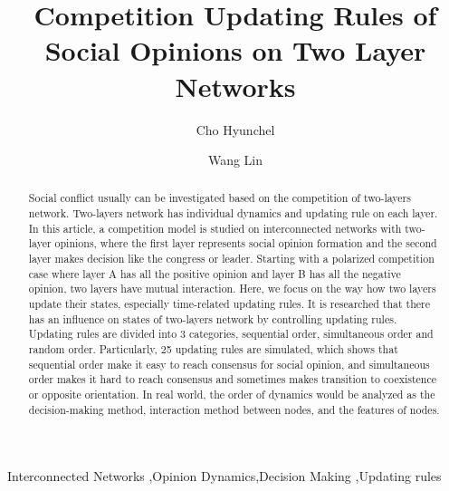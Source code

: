 \documentclass[review]{elsarticle}
\begin{document}
\begin{frontmatter}
\title{Competition Updating Rules of Social Opinions on Two Layer Networks}

\author[mymainaddress,mysecondaryaddress]{Cho Hyunchel}
\author[mymainaddress,mysecondaryaddress]{Wang Lin}
\address[mymainaddress]{Department of Automation, Shanghai Jiao Tong University, Shanghai 200240, P. R. China}
\address[mysecondaryaddress]{Key Laboratory of System Control and Information Processing, Ministry of Education of China, Shanghai 200240, P. R. China}

\begin{abstract}
Social conflict usually can be investigated based on the competition of two-layers network. Two-layers network has individual dynamics and updating rule on each layer. In this article, a competition model is studied on interconnected networks with two-layer opinions, where the first layer represents social opinion formation and the second layer makes decision like the congress or leader. Starting with a polarized competition case where layer A has all the positive opinion and layer B has all the negative opinion, two layers have mutual interaction. Here, we focus on the way how two layers update their states, especially time-related updating rules. It is researched that there has an influence on states of two-layers network by controlling updating rules. Updating rules are divided into 3 categories, sequential order, simultaneous order and random order. Particularly, 25 updating rules are simulated, which shows that sequential order make it easy to reach consensus for social opinion, and simultaneous order makes it hard to reach consensus and sometimes makes transition to coexistence or opposite orientation. In real world, the order of dynamics would be analyzed as the decision-making method, interaction method between nodes, and the features of nodes. 

\end{abstract}

\begin{keyword}
Interconnected Networks \sep Opinion Dynamics\sep Decision Making \sep Updating rules
\end{keyword}

\end{frontmatter}
\linenumbers
\end{document}
